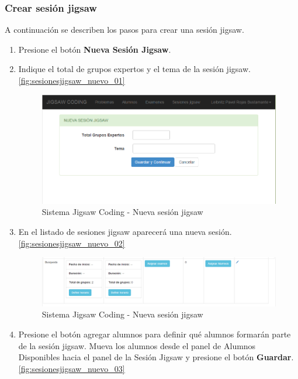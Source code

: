 \subsubsection{Crear sesión jigsaw}
A continuación se describen los pasos para crear una sesión jigsaw.
\begin{enumerate}
	\item Presione el botón \textbf{Nueva Sesión Jigsaw}.
	\item Indique el total de grupos expertos y el tema de la sesión jigsaw. \autoref{fig:sesionesjigsaw_nuevo_01}
	\begin{figure}[h!]
	\centering
	\caption[SJC Sesiones jigsaw]{Sistema Jigsaw Coding - Nueva sesión jigsaw}
	\label{fig:sesionesjigsaw_nuevo_01}
	\includegraphics[scale=0.5]{figuras/usodelsistema/docente/sesionesjigsaw_nuevo_01}
	\end{figure}
	\item En el listado de sesiones jigsaw aparecerá una nueva sesión.\autoref{fig:sesionesjigsaw_nuevo_02}
	\begin{figure}[h!]
	\centering
	\caption{Sistema Jigsaw Coding - Nueva sesión jigsaw}
	\label{fig:sesionesjigsaw_nuevo_02}
	\includegraphics[scale=0.5]{figuras/usodelsistema/docente/sesionesjigsaw_nuevo_02}
	\end{figure}
	\item Presione el botón agregar alumnos para definir qué alumnos formarán parte de la sesión jigsaw. Mueva los alumnos desde el panel de Alumnos Disponibles hacia el panel de la Sesión Jigsaw y presione el botón \textbf{Guardar}.  \autoref{fig:sesionesjigsaw_nuevo_03}
	\begin{figure}[h!]

\end{figure}
\end{enumerate}
